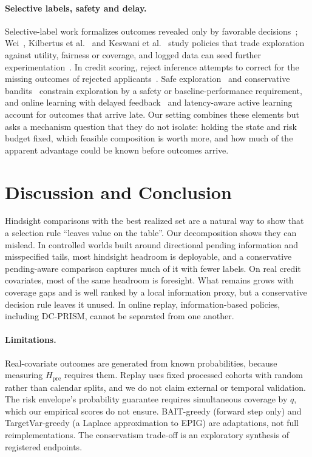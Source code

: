 \documentclass[runningheads]{llncs}
\begin{document}
\paragraph{Selective labels, safety and delay.} Selective-label work formalizes outcomes revealed only by favorable decisions~\cite{lakkaraju2017selective}; Wei~\cite{wei2021selective}, Kilbertus et al.~\cite{kilbertus2020fair} and Keswani et al.~\cite{keswani2024partial} study policies that trade exploration against utility, fairness or coverage, and logged data can seed further experimentation~\cite{yan2018logged}. In credit scoring, reject inference attempts to correct for the missing outcomes of rejected applicants~\cite{crook2004reject}. Safe exploration~\cite{sui2015safe} and conservative bandits~\cite{wu2016conservative} constrain exploration by a safety or baseline-performance requirement, and online learning with delayed feedback~\cite{joulani2013delayed,chapelle2014delayed} and latency-aware active learning~\cite{pham2022latency} account for outcomes that arrive late. Our setting combines these elements but asks a mechanism question that they do not isolate: holding the state and risk budget fixed, which feasible composition is worth more, and how much of the apparent advantage could be known before outcomes arrive.

\section{Discussion and Conclusion}
\label{sec:conclusion}
Hindsight comparisons with the best realized set are a natural way to show that a selection rule ``leaves value on the table''. Our decomposition shows they can mislead. In controlled worlds built around directional pending information and misspecified tails, most hindsight headroom is deployable, and a conservative pending-aware comparison captures much of it with fewer labels. On real credit covariates, most of the same headroom is foresight. What remains grows with coverage gaps and is well ranked by a local information proxy, but a conservative decision rule leaves it unused. In online replay, information-based policies, including DC-PRISM, cannot be separated from one another.

\paragraph{Limitations.} Real-covariate outcomes are generated from known probabilities, because measuring $H_{\mathrm{pre}}$ requires them. Replay uses fixed processed cohorts with random rather than calendar splits, and we do not claim external or temporal validation. The risk envelope's probability guarantee requires simultaneous coverage by $q$, which our empirical scores do not ensure. BAIT-greedy (forward step only) and TargetVar-greedy (a Laplace approximation to EPIG) are adaptations, not full reimplementations. The conservatism trade-off is an exploratory synthesis of registered endpoints.
\end{document}
